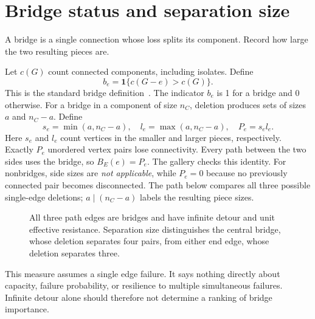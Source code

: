 \documentclass[11pt]{article}
\newcommand{\plain}[1]{\noindent #1\par\smallskip}
\begin{document}
\section{Bridge status and separation size}
\plain{A bridge is a single connection whose loss splits its component. Record how large the two resulting pieces are.}
Let $c(G)$ count connected components, including isolates. Define
\begin{equation}
 b_e=\mathbf 1\{c(G-e)>c(G)\}.
\end{equation}
This is the standard bridge definition~\cite{nxbridge}. The indicator $b_e$ is 1 for a bridge and 0 otherwise. For a bridge in a component of size $n_C$, deletion produces sets of sizes $a$ and $n_C-a$. Define
\begin{equation}
 s_e=\min(a,n_C-a),\quad l_e=\max(a,n_C-a),\quad P_e=s_e l_e.
\end{equation}
Here $s_e$ and $l_e$ count vertices in the smaller and larger pieces, respectively. Exactly $P_e$ unordered vertex pairs lose connectivity. Every path between the two sides uses the bridge, so $B_E(e)=P_e$. The gallery checks this identity. For nonbridges, side sizes are \emph{not applicable}, while $P_e=0$ because no previously connected pair becomes disconnected. The path below compares all three possible single-edge deletions; $a\mid(n_C-a)$ labels the resulting piece sizes.
\par
\begin{figure}[H]\centering
{}
\caption{All three path edges are bridges and have infinite detour and unit effective resistance. Separation size distinguishes the central bridge, whose deletion separates four pairs, from either end edge, whose deletion separates three.}
\end{figure}
\par
This measure assumes a single edge failure. It says nothing directly about capacity, failure probability, or resilience to multiple simultaneous failures. Infinite detour alone should therefore not determine a ranking of bridge importance.

\clearpage
\end{document}
